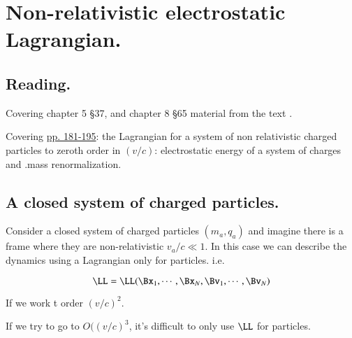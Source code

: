 %
%

\chapter{Non-relativistic electrostatic Lagrangian.}
\label{chap:relativisticElectrodynamicsL24}
{}
\date{Mar 30, 2011}

\beginArtNoToc

\section{Reading.}

Covering chapter 5 \S 37, and chapter 8 \S 65 material from the text \cite{landau1980classical}.

Covering \href{http://www.physics.utoronto.ca/~poppitz/epoppitz/PHY450_files/RelEMpp181-195.pdf}{pp. 181-195}: the Lagrangian for a system of non relativistic charged particles to zeroth order in $(v/c)$: electrostatic energy of a system of charges and .mass renormalization.

\section{A closed system of charged particles.}

Consider a closed system of charged particles $(m_a, q_a)$ and imagine there is a frame where they are non-relativistic $v_a/c \ll 1$.  In this case we can describe the dynamics using a Lagrangian only for particles.  i.e.

\begin{equation}\label{eqn:relativisticElectrodynamicsL24:50}
\LL = \LL( \Bx_1, \cdots, \Bx_N, \Bv_1, \cdots, \Bv_N)
\end{equation}

If we work t order $(v/c)^2$.

If we try to go to $O((v/c)^3$, it's difficult to only use $\LL$ for particles.

